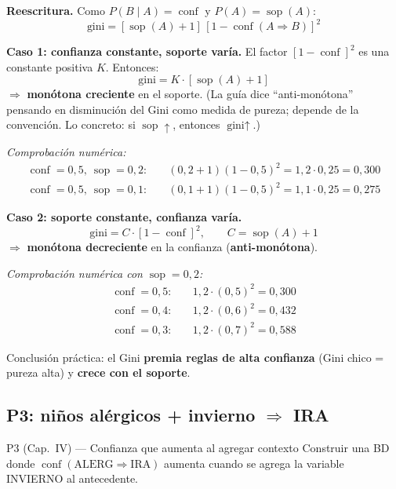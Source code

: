 \documentclass[11pt,a4paper]{article}
\newcommand{\conf}{\operatorname{conf}}
\newcommand{\sop}{\operatorname{sop}}
\begin{document}
\textbf{Reescritura.} Como $P(B \mid A) = \conf$ y $P(A) = \sop(A)$:
\[
\text{gini} = [\sop(A) + 1]\,[1 - \conf(A \Rightarrow B)]^2
\]

\textbf{Caso 1: confianza constante, soporte varía.}
El factor $[1 - \conf]^2$ es una constante positiva $K$. Entonces:
\[
\text{gini} = K \cdot [\sop(A) + 1]
\]
$\Rightarrow$ \textbf{monótona creciente} en el soporte. (La guía dice ``anti-monótona''
pensando en disminución del Gini como medida de pureza; depende de la convención.
Lo concreto: si $\sop \uparrow$, entonces $\text{gini} \uparrow$.)

\emph{Comprobación numérica:}
\begin{align*}
\conf = 0{,}5,\ \sop = 0{,}2:\quad &(0{,}2 + 1)(1 - 0{,}5)^2 = 1{,}2 \cdot 0{,}25 = 0{,}300 \\
\conf = 0{,}5,\ \sop = 0{,}1:\quad &(0{,}1 + 1)(1 - 0{,}5)^2 = 1{,}1 \cdot 0{,}25 = 0{,}275
\end{align*}

\textbf{Caso 2: soporte constante, confianza varía.}
\[
\text{gini} = C \cdot [1 - \conf]^2,\qquad C = \sop(A) + 1
\]
$\Rightarrow$ \textbf{monótona decreciente} en la confianza (\textbf{anti-monótona}).

\emph{Comprobación numérica con $\sop = 0{,}2$:}
\begin{align*}
\conf = 0{,}5:\quad &1{,}2 \cdot (0{,}5)^2 = 0{,}300 \\
\conf = 0{,}4:\quad &1{,}2 \cdot (0{,}6)^2 = 0{,}432 \\
\conf = 0{,}3:\quad &1{,}2 \cdot (0{,}7)^2 = 0{,}588
\end{align*}

\begin{tipbox}
Conclusión práctica: el Gini \textbf{premia reglas de alta confianza} (Gini chico = pureza alta) y \textbf{crece con el soporte}.
\end{tipbox}

\subsection{P3: niños alérgicos + invierno $\Rightarrow$ IRA}

\begin{ejerciciobox}{P3 (Cap.\ IV) — Confianza que aumenta al agregar contexto}
Construir una BD donde $\conf(\text{ALERG} \Rightarrow \text{IRA})$ aumenta cuando se
agrega la variable INVIERNO al antecedente.
\end{ejerciciobox}
\end{document}
